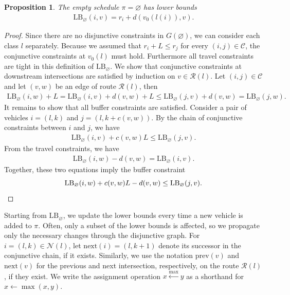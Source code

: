 \documentclass{article}
\theoremstyle{definition}
\theoremstyle{plain}
\newtheorem{proposition}{Proposition}
\begin{document}
\begin{proposition}
  The empty schedule $\pi = \varnothing$ has lower bounds
  \begin{align}
    \mathrm{LB}_{\varnothing}(i, v) = r_{i} + d(v_{0}(l(i)), v) .
  \end{align}
\end{proposition}
\begin{proof}
  Since there are no disjunctive constraints in $G(\varnothing)$, we can
  consider each class $l$ separately.
  Because we assumed that $r_{i} + L \leq r_{j}$ for every
  $(i, j) \in \mathcal{C}$, the conjunctive constraints at $v_{0}(l)$ must hold.
  Furthermore all travel constraints are tight in this definition of
  $\mathrm{LB}_{\varnothing}$.
  We show that conjunctive constraints at downstream intersections are satisfied
  by induction on $v \in \mathcal{R}(l)$. Let $(i, j) \in \mathcal{C}$ and let
  $(v, w)$ be an edge of route $\mathcal{R}(l)$, then
  \begin{align*} \mathrm{LB}_{\varnothing}(i, w) + L = \mathrm{LB}_{\varnothing}(i, v) + d(v, w) + L \leq \mathrm{LB}_{\varnothing}(j, v) + d(v, w) = \mathrm{LB}_{\varnothing}(j, w) .
  \end{align*}
  It remains to show that all buffer constraints are satisfied. Consider a pair
  of vehicles $i = (l, k)$ and $j = (l, k + c(v,w))$. By the chain of
  conjunctive constraints between $i$ and $j$, we have
  \begin{align*}
    \mathrm{LB}_{\varnothing}(i, v) + c(v, w) L \leq \mathrm{LB}_{\varnothing}(j, v) .
  \end{align*}
  From the travel constraints, we have
  \begin{align*}
    \mathrm{LB}_{\varnothing}(i, w) - d(v,w) = \mathrm{LB}_{\varnothing}(i, v) .
  \end{align*}
  Together, these two equations imply the buffer constraint
  \begin{equation*}
    \mathrm{LB}_{\varnothing}(i, w) + c(v, w) L - d(v, w) \leq
    \mathrm{LB}_{\varnothing}(j, v) . \qedhere
  \end{equation*}
\end{proof}

Starting from $\mathrm{LB}_{\varnothing}$, we update the lower bounds every time
a new vehicle is added to $\pi$. Often, only a subset of the lower bounds is
affected, so we propagate only the necessary changes through the disjunctive
graph. For $i = (l, k) \in \mathcal{N}(l)$, let $\mathrm{next}(i) = (l, k + 1)$
denote its successor in the conjunctive chain, if it exists. Similarly, we use
the notation $\mathrm{prev}(v)$ and $\mathrm{next}(v)$ for the previous and next
intersection, respectively, on the route $\mathcal{R}(l)$, if they exist. We
write the assignment operation $x \xleftarrow{\max} y$ as a shorthand for
$x \gets \max(x, y)$.
\end{document}
